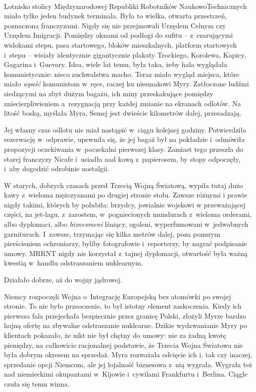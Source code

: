 \documentclass[oneside,polish,11pt,sfheadings]{mwbk}
\begin{document}
~

Lotnisko stolicy Międzynarodowej Republiki Robotników
Naukowo\dywiz Technicznych miało tylko jeden budynek terminala. Była to
wielka, otwarta przestrzeń, poznaczona franczyzami. Nigdy się nie
przejmowali Urzędem Celnym czy Urzędem Imigracji. Pomiędzy oknami od
podłogi do sufitu -- z~czarującymi widokami stepu, pasa startowego,
bloków mieszkalnych, platform startowych i~stepu -- wisiały identycznie
gigantycznie plakaty Trockiego, Korolewa, Kapicy, Gagarina i~Guevary.
Idea, wiele lat temu, była taka, żeby hala wyglądała komunistycznie:
nieco zuchwalstwa macho. Teraz miało wygląd miejsca, które miało
\textit{wpaść} komunistom w~ręce, raczej ku niesmakowi Myry. Zatłoczone
ludźmi siedzącymi na zbyt dużym bagażu, ich miny przeskakujące pomiędzy
zniecierpliwieniem a~rezygnacją przy każdej zmianie na ekranach odlotów.
Na litość boską, myślała Myra, Semej jest dwieście kilometrów dalej,
przesadzają.

Jej własny czas odlotu nie miał nastąpić w~ciągu kolejnej godziny.
Potwierdziła rezerwację w~odprawie, upewniła się, że jej bagaż był na
pokładzie i~odmówiła propozycji oczekiwania w~poczekalni pierwszej
klasy. Zamiast tego przeszła do starej franczyzy Nicafe i~usiadła nad
kawą z~papierosem, by stopy odpoczęły, i~aby dogodzić odrobinie
nostalgii.

W starych, dobrych czasach przed Trzecią Wojną Światową, wypiła tutaj
dużo kawy z~wieloma mężczyznami po drugiej stronie stołu. Zawsze różnymi
i prawie nigdy takimi, których by polubiła: brzydcy, jowialnie wojskowi
w przeważającej części, na jet-lagu, z~zarostem, w~pogniecionych
mundurach z~wieloma orderami, albo dyplomaci, albo \textit{biznesmeni}
lśniący, ogoleni, wyperfumowani w~jedwabnych garniturach. I~zawsze,
trzymając się kilka metrów dalej, poza ponurym pierścieniem ochroniarzy,
byliby fotografowie i~reporterzy, by nagrać podpisanie umowy. MRRNT
nigdy nie korzystał z~tajnej dyplomacji, otwartość była ważną kwestią w~handlu odstraszaniem nuklearnym.

Działało dobrze, aż do wojny jądrowej.

Niemcy rozpoczęli Wojna o~Integrację Europejską bez atomówki po swojej
stronie. To nie było przeoczenie, to był istotny element zaskoczenia.
Kiedy ich pierwsza fala przejechała bezpiecznie przez granicę Polski,
złożyli Myrze bardzo hojną ofertę na zbywalne odstraszanie nuklearne.
Dzikie wydzwanianie Myry po klientach pokazało, że nikt nie był chętny
do umowy: nie za żadną kwotę pieniędzy, na całkowicie racjonalnej
podstawie, że Trzecia Wojna Światowa nie była dobrym okresem na
sprzedaż. Myra rozważała odcięcie ich i, tak czy inaczej, sprzedanie
opcji Niemcom, ale jej lojalność biznesowa z~nią wygrała. Wygrała też
nad niemieckimi okupantami w~Kijowie i~cywilami Frankfurtu i~Berlina.
Ciągle czuła się temu winna.
\end{document}
